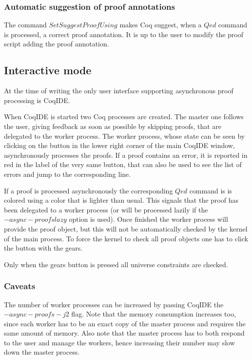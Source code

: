 \subsubsection{Automatic suggestion of proof annotations}

The command $Set Suggest Proof Using$ makes Coq suggest, when a $Qed$
command is processed, a correct proof annotation.  It is up to the user
to modify the proof script adding the proof annotation.

\subsection{Interactive mode}

At the time of writing the only user interface supporting asynchronous proof
processing is CoqIDE.  

When CoqIDE is started two Coq processes are created.  The master one follows
the user, giving feedback as soon as possible by skipping proofs, that are
delegated to the worker process.  The worker process, whose state can be seen
by clicking on the button in the lower right corner of the main CoqIDE window,
asynchronously processes the proofs.  If a proof contains an error, it is
reported in red in the label of the very same button, that can also be used to
see the list of errors and jump to the corresponding line.

If a proof is processed asynchronously the corresponding $Qed$ command is
is colored using a color that is lighter than usual.  This signals that
the proof has been delegated to a worker process (or will be processed
lazily if the $-async-proofs lazy$ option is used).  Once finished the
worker process will provide the proof object, but this will not be
automatically checked by the kernel of the main process.  To force
the kernel to check all proof objects one has to click the button
with the gears.

Only when the gears button is pressed all universe constraints are checked.

\subsubsection{Caveats}
The number of worker processes can be increased by passing CoqIDE the
$-async-proofs-j 2$ flag.  Note that the memory consumption increases
too, since each worker has to be an exact copy of the master process
and requires the same amount of memory.  Also note that the master process
has to both respond to the user and manage the workers, hence increasing
their number may slow down the master process.

